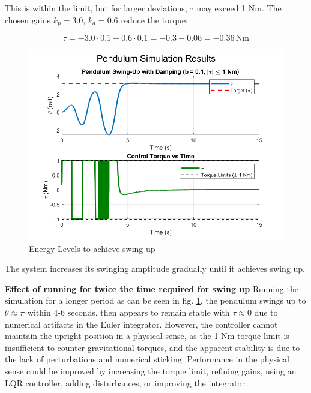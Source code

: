 \documentclass[12pt,a4paper]{article}
\begin{document}
This is within the limit, but for larger deviations, \(\tau\) may exceed 1 Nm. The chosen gains \( k_p = 3.0 \), \( k_d = 0.6 \) reduce the torque:

\begin{equation}
\tau = -3.0 \cdot 0.1 - 0.6 \cdot 0.1 = -0.3 - 0.06 = -0.36 \, \text{Nm}
\end{equation}



\begin{figure}[htbp]
  \centering
  \includegraphics[width=0.9\linewidth]{../figs/pd_swing_up.png}
  \caption{Energy Levels to achieve swing up}
  \label{fig:pd_swing_up}
\end{figure}
The system increases its swinging amptitude gradually until it achieves swing up.

\textbf{Effect of running for twice the time required for swing up}
Running the simulation for a longer period as can be seen in fig. \ref{fig:pd_swing_up}, the pendulum swings up to $\theta \approx \pi$ within 4-6 seconds, then appears to remain stable with $\tau \approx 0$ due to numerical artifacts in the Euler integrator. However, the controller cannot maintain the upright position in a physical sense, as the 1 Nm torque limit is insufficient to counter gravitational torques, and the apparent stability is due to the lack of perturbations and numerical sticking. Performance in the physical sense could be improved by increasing the torque limit, refining gains, using an LQR controller, adding disturbances, or improving the integrator.
\end{document}
